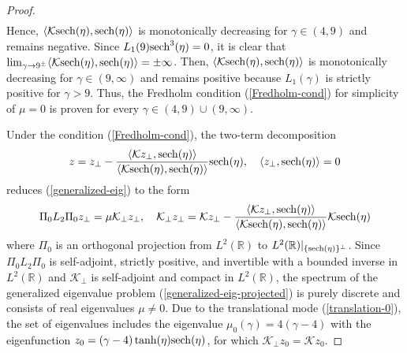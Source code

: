 \documentclass[12pt,reqno]{amsart}
\numberwithin{equation}{section}
\begin{document}
\begin{proof}
\begin{align*}
\end{align*}
Hence, $\langle \mathcal{K} {\rm sech}(\eta), {\rm sech}(\eta) \rangle$ is monotonically decreasing for $\gamma \in (4,9)$ and remains negative. 
Since $L_1(9) {\rm sech}^3(\eta) = 0$, it is clear that $\lim_{\gamma \to 9^{\pm}} \langle \mathcal{K} {\rm sech}(\eta), {\rm sech}(\eta) \rangle = \pm \infty$. 
Then, $\langle \mathcal{K} {\rm sech}(\eta), {\rm sech}(\eta) \rangle$ is monotonically decreasing for $\gamma \in (9,\infty)$ and remains positive 
because $L_1(\gamma)$ is strictly positive for $\gamma > 9$. Thus, the Fredholm condition (\ref{Fredholm-cond}) 
for simplicity of $\mu = 0$ is proven for every $\gamma \in (4,9) \cup (9,\infty)$. 

Under the condition (\ref{Fredholm-cond}),  the two-term decomposition 
$$
z = z_{\perp} - \frac{\langle \mathcal{K} z_{\perp}, {\rm sech}(\eta) \rangle}{\langle \mathcal{K} {\rm sech}(\eta), {\rm sech}(\eta) \rangle} {\rm sech}(\eta), \quad \langle z_{\perp}, {\rm sech}(\eta) \rangle = 0
$$
reduces (\ref{generalized-eig}) to the form 
\begin{equation}
\label{generalized-eig-projected}
\Pi_0 L_2 \Pi_0 z_{\perp} = \mu \mathcal{K}_{\perp} z_{\perp}, \quad \mathcal{K}_{\perp} z_{\perp} = \mathcal{K} z_{\perp} - \frac{\langle \mathcal{K} z_{\perp}, {\rm sech}(\eta) \rangle}{\langle \mathcal{K} {\rm sech}(\eta), {\rm sech}(\eta) \rangle } \mathcal{K} {\rm sech}(\eta) 
\end{equation}
where $\Pi_0$ is an orthogonal projection from $L^2(\mathbb{R})$ to $L^2(\mathbb{R}) |_{\{ {\rm sech}(\eta)\}^{\perp}}$. 
Since $\Pi_0 L_2 \Pi_0$ is self-adjoint, strictly positive, and invertible with a bounded inverse in $L^2(\mathbb{R})$ 
and $\mathcal{K}_{\perp}$ is self-adjoint and compact in $L^2(\mathbb{R})$, the spectrum of the generalized eigenvalue problem 
(\ref{generalized-eig-projected}) is purely discrete and consists of real eigenvalues $\mu \neq 0$. 
Due to the translational mode (\ref{translation-0}), the set of eigenvalues includes the eigenvalue $\mu_0(\gamma) = 4 (\gamma - 4)$ 
with the eigenfunction $z_0 = (\gamma - 4) \tanh(\eta) {\rm sech}(\eta)$, for which $\mathcal{K}_{\perp} z_0 = \mathcal{K} z_0$.


\end{proof}
\end{document}
